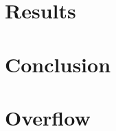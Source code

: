 \documentclass[12pt, a4paper]{report}
\begin{document}
\chapter{Results}

\chapter{Conclusion}

\appendix
\chapter{Overflow}

\sloppy

\end{document}

